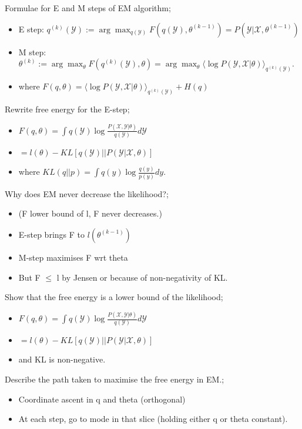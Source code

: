 \documentclass{article}
\begin{document}
Formulae for E and M steps of EM algorithm; \begin{itemize} \item E step: $q^{(k)}(\mathcal{Y}):=\arg\max_{q(\mathcal{Y})}  F(q(\mathcal{Y}),\theta^{(k-1)}) = P(\mathcal{Y}|\mathcal{X},\theta^{(k-1)})$ \item M step: $\theta^{(k)}:=\arg\max_\theta F(q^{(k)}(\mathcal{Y}),\theta)=\arg\max_{\theta}\langle \log P(\mathcal{Y}, \mathcal{X}|\theta)\rangle_{q^{(k)}(\mathcal{Y})}$.  \item where $F(q,\theta)=\langle \log P(\mathcal{Y}, \mathcal{X}|\theta)\rangle_{q^{(k)}(\mathcal{Y})}+H(q)$ \end{itemize}

Rewrite free energy for the E-step; \begin{itemize} \item $F(q,\theta) = \int q(\mathcal{Y})\log \frac{P(\mathcal{X, Y}|\theta)}{q(\mathcal{Y})}d\mathcal{Y}$ \item $= l(\theta) - KL[q(\mathcal{Y})||P(\mathcal{Y}|\mathcal{X},\theta)]$ \item where $KL(q||p) = \int q(y)\log\frac{q(y)}{p(y)}dy$.  \end{itemize}

Why does EM never decrease the likelihood?; \begin{itemize} \item (F lower bound of l, F never decreases.) \item E-step brings F to $l(\theta^{(k-1)})$ \item M-step maximises F wrt theta \item But F $\leq$ l by Jensen or because of non-negativity of KL.  \end{itemize}

Show that the free energy is a lower bound of the likelihood; \begin{itemize} \item $F(q,\theta) = \int q(\mathcal{Y})\log \frac{P(\mathcal{X, Y}|\theta)}{q(\mathcal{Y})}d\mathcal{Y}$ \item $= l(\theta) - KL[q(\mathcal{Y})||P(\mathcal{Y}|\mathcal{X},\theta)]$ \item and KL is non-negative.  \end{itemize} 

Describe the path taken to maximise the free energy in EM.; \begin{itemize} \item Coordinate ascent in q and theta (orthogonal) \item At each step, go to mode in that slice (holding either q or theta constant).  \end{itemize}
\end{document}
